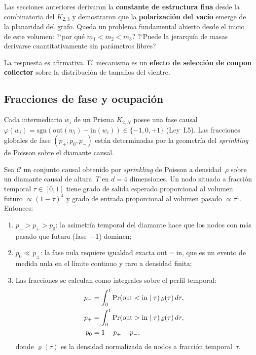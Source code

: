 \documentclass[11pt, a4paper, openany]{book}
\begin{document}
Las secciones anteriores derivaron la \textbf{constante de estructura
fina} desde la combinatoria del $K_{2,3}$ y demostraron que la
\textbf{polarizaci\'on del vac\'io} emerge de la planaridad del grafo.
Queda un problema fundamental abierto desde el inicio de este
volumen: ?`por qu\'e $m_1 < m_2 < m_3$? ?`Puede la jerarqu\'ia de
masas derivarse cuantitativamente sin par\'ametros libres?

La respuesta es afirmativa. El mecanismo es un \textbf{efecto de
selecci\'on de coupon collector} sobre la distribuci\'on de tama\~nos
del vientre.

\subsection{Fracciones de fase y ocupaci\'on}

Cada intermediario $w_i$ de un Prisma $K_{2,N}$ posee una fase causal
$\varphi(w_i) = \mathrm{sgn}(\mathrm{out}(w_i) - \mathrm{in}(w_i))
\in \{-1, 0, +1\}$ (Ley~L5). Las fracciones globales de fase
$(p_+, p_0, p_-)$ est\'an determinadas por la geometr\'ia del
\emph{sprinkling} de Poisson sobre el diamante causal.

\begin{theorem}
\label{thm:phase-fractions}
Sea $\mathcal{C}$ un conjunto causal obtenido por \emph{sprinkling}
de Poisson a densidad~$\rho$ sobre un diamante causal de altura~$T$
en $d = 4$ dimensiones. Un nodo situado a fracci\'on temporal
$\tau \in [0,1]$ tiene grado de salida esperado proporcional al
volumen futuro $\propto (1-\tau)^4$ y grado de entrada proporcional
al volumen pasado $\propto \tau^4$. Entonces:
\begin{enumerate}
  \item $p_- > p_+ > p_0$: la asimetr\'ia temporal del diamante hace que
        los nodos con m\'as pasado que futuro (fase~$-1$) dominen;
  \item $p_0 \ll p_\pm$: la fase nula requiere igualdad exacta
        $\mathrm{out} = \mathrm{in}$, que es un evento de medida
        nula en el l\'imite continuo y raro a densidad finita;
  \item Las fracciones se calculan como integrales sobre el perfil
        temporal:
        \begin{align}
          p_- &= \int_0^1 \Pr(\mathrm{out} < \mathrm{in} \mid \tau)
                \,\varrho(\tau)\,d\tau, \notag\\
          p_+ &= \int_0^1 \Pr(\mathrm{out} > \mathrm{in} \mid \tau)
                \,\varrho(\tau)\,d\tau, \label{eq:phase-fractions}\\
          p_0 &= 1 - p_+ - p_-, \notag
        \end{align}
        donde $\varrho(\tau)$ es la densidad normalizada de nodos
        a fracci\'on temporal~$\tau$.
\end{enumerate}
\end{theorem}
\end{document}
